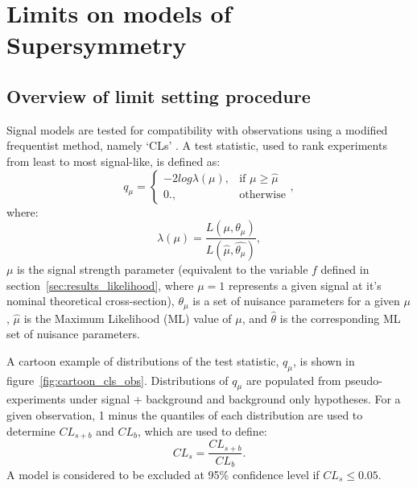 \section{Limits on models of Supersymmetry}  %
\label{sec:interpretation_limits}

\subsection{Overview of limit setting procedure}
Signal models are tested for compatibility with observations using
a modified frequentist method, namely `CLs' \cite{alread-cls}. A test statistic,
used to rank
experiments from least to most signal-like, is defined as:
% 
\begin{equation}
q_{\mu} = \begin{cases} -2log\lambda(\mu), & \mbox{if } \mu \geq \hat{\mu} \\
0., & \mbox{otherwise} \end{cases},
\end{equation}
% 
where:
% 
\begin{equation}
\lambda(\mu) = \frac{L(\mu, \theta_{\mu})}{L(\hat{\mu}, \hat{\theta_{\mu}})},
\end{equation}
% 
$\mu$ is the signal strength parameter (equivalent to the variable $f$ defined
in section~\ref{sec:results_likelihood}, where $\mu=1$ represents a given
signal at it's nominal theoretical cross-section), $\theta_{\mu}$ is a set of
nuisance parameters for a given $\mu$, $\hat {\mu}$ is the Maximum Likelihood
(ML) value of $\mu$, and $\hat{\theta}$ is the corresponding ML set of nuisance
parameters.

A cartoon example of distributions of the test statistic, $q_{\mu}$, is
shown in figure~\ref{fig:cartoon_cls_obs}. 
Distributions of $q_{\mu}$ are populated from pseudo-experiments under
signal + background and background only hypotheses. For a given observation, 1
minus the quantiles of each distribution are used to determine $CL_{s+b}$ and
$CL_b$, which are used to define:
% 
\begin{equation}
CL_s = \frac{CL_{s+b}}{CL_b}.
\end{equation}
% 
A model is considered to be excluded at 95\% confidence level if
$CL_s \leq 0.05$.

